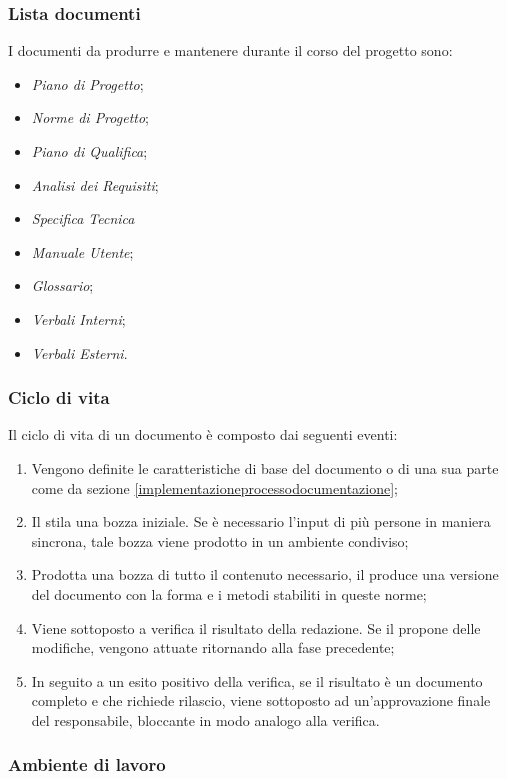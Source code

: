 \subsubsection{Lista documenti}
I documenti da produrre e mantenere durante il corso del progetto sono:
\begin{itemize}
  \item \emph{Piano di Progetto};
  \item \emph{Norme di Progetto};
  \item \emph{Piano di Qualifica};
  \item \emph{Analisi dei Requisiti};
  \item \emph{Specifica Tecnica}
  \item \emph{Manuale Utente};
  \item \emph{Glossario};
  \item \emph{Verbali Interni};
  \item \emph{Verbali Esterni}.
\end{itemize}

\subsubsection{Ciclo di vita}
Il ciclo di vita di un documento è composto dai seguenti eventi:
\begin{enumerate}
  \item Vengono definite le caratteristiche di base del documento o di una sua parte come da sezione \ref{implementazioneprocessodocumentazione};
  \item Il \Redattore stila una bozza iniziale. Se è necessario l'input di più persone in maniera sincrona, tale bozza viene prodotto in un ambiente condiviso;
  \item Prodotta una bozza di tutto il contenuto necessario, il \Redattore produce una versione del documento con la forma e i metodi stabiliti in queste norme;
  \item Viene sottoposto a verifica il risultato della redazione. Se il \Verificatore propone delle modifiche, vengono attuate ritornando alla fase precedente;
  \item In seguito a un esito positivo della verifica, se il risultato è un documento completo e che richiede rilascio, viene sottoposto ad un'approvazione finale del responsabile, bloccante in modo analogo alla verifica.
\end{enumerate}

\subsubsection{Ambiente di lavoro}
